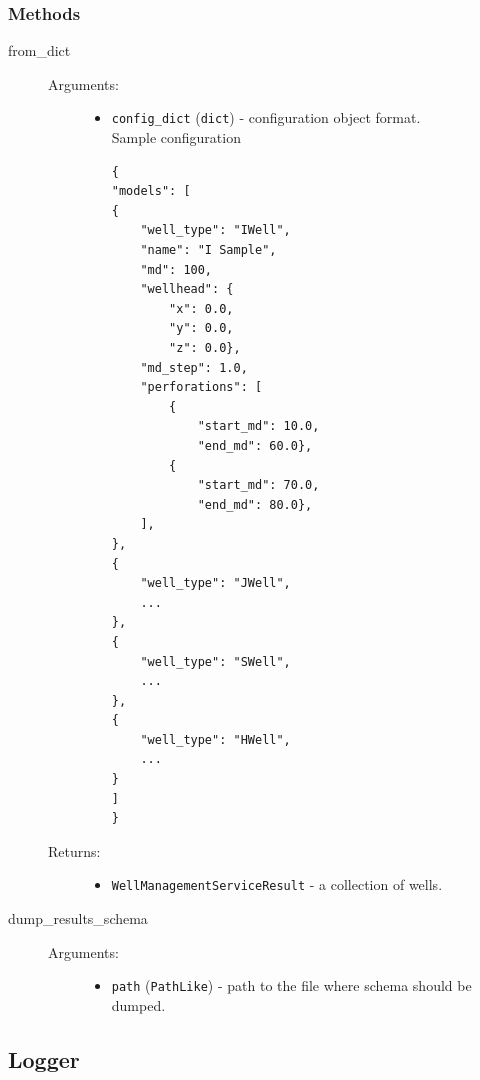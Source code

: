 \documentclass[english,10pt,a4paper]{article}
\begin{document}
	\subsubsection{Methods}
	\begin{description}

		\item[ \colorbox{gray!20}{from\_dict}] \hfill
		\begin{description}
			\item[Arguments:] \hfill
			\begin{itemize}
				\item \texttt{config\_dict} (\texttt{dict}) - configuration object format.\\
				Sample configuration\\
				\begin{lstlisting}
{
"models": [
{
	"well_type": "IWell",
	"name": "I Sample",
	"md": 100,
	"wellhead": {
		"x": 0.0,
		"y": 0.0,
		"z": 0.0},
	"md_step": 1.0,
	"perforations": [
		{
			"start_md": 10.0,
			"end_md": 60.0},
		{
			"start_md": 70.0,
			"end_md": 80.0},
	],
},
{
	"well_type": "JWell",
	...
},
{
	"well_type": "SWell",
	...
},
{
	"well_type": "HWell",
	...
}
]
}
				\end{lstlisting}
			\end{itemize}
			\item[Returns:] \hfill
			\begin{itemize}
				\item \texttt{WellManagementServiceResult} - a collection of wells.
			\end{itemize}
		\end{description}\newpage
		\item[\colorbox{gray!20}{dump\_results\_schema}] \hfill
		\begin{description}
			\item[Arguments:] \hfill
			\begin{itemize}
				\item \texttt{path} (\texttt{PathLike}) - path to the file where schema should be dumped.
			\end{itemize}
		\end{description}
	\end{description}


	\newpage
	\subsection{Logger}
\end{document}
